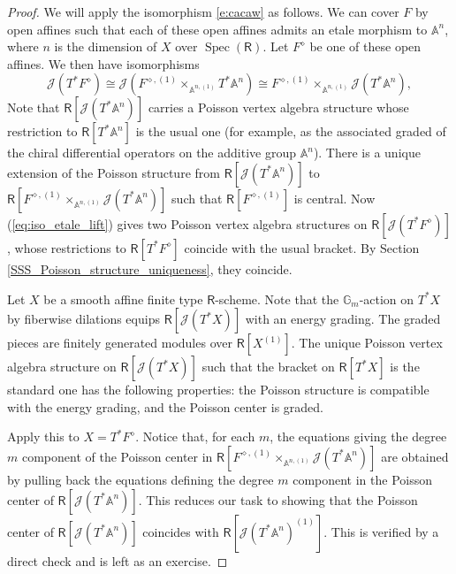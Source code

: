\documentclass{amsart}
\theoremstyle{definition}
\newcommand{\Ring}{\mathsf{R}}
\newcommand{\Jet}{\mathscr{J}}
\numberwithin{equation}{section}
\begin{document}
\begin{proof}
We will apply the  isomorphism \eqref{e:cacaw} as follows. We can cover $F$ by open affines such that each of these open affines admits an etale morphism to $\mathbb{A}^n$, where $n$ is the dimension of $X$ over $\operatorname{Spec}(\Ring)$. Let $F^\diamond$ be one of these open affines.  We then have isomorphisms
\begin{equation}\label{eq:iso_etale_lift}
\Jet(T^*F^\diamond)\cong \Jet(F^{\diamond,(1)}\times_{\mathbb{A}^{n,(1)}} T^* \mathbb{A}^n ) \cong F^{\diamond,(1)}\times_{\mathbb{A}^{n,(1)}}\Jet(T^*\mathbb{A}^n),
\end{equation}
Note that $\Ring[\Jet(T^*\mathbb{A}^n)]$ carries a Poisson vertex algebra structure whose restriction to $\Ring[T^*\mathbb{A}^n]$ is the usual one (for example, as the associated graded of the chiral differential operators on the additive group $\mathbb{A}^n$). 
There is a unique extension of the Poisson structure from 
$\Ring[\Jet(T^*\mathbb{A}^n)]$ to $\Ring[F^{\diamond,(1)}\times_{\mathbb{A}^{n,(1)}}\Jet(T^*\mathbb{A}^n)]$ such that $\Ring[F^{\diamond,(1)}]$ is central.
Now (\ref{eq:iso_etale_lift}) gives two Poisson vertex algebra structures on $\Ring[\Jet(T^*F^\diamond)]$, whose restrictions to $\Ring[T^*F^\diamond]$ coincide with the usual bracket. By Section \ref{SSS_Poisson_structure_uniqueness}, they coincide. 

Let $X$ be a smooth affine finite type $\Ring$-scheme.  
Note that the $\mathbb{G}_m$-action on $T^*X$ by fiberwise dilations equips $\Ring[\Jet(T^*X)]$ with an energy grading. The graded pieces are finitely generated modules over $\Ring[X^{(1)}]$. 
The unique  Poisson vertex algebra structure on $\Ring[\Jet(T^*X)]$ such that the bracket on $\Ring[T^*X]$ is the standard one has the following properties: the Poisson structure is compatible with the energy grading, and the Poisson center is graded. 

Apply this to $X=T^*F^\diamond$.
Notice that, for each $m$, the equations giving the degree $m$ component of the Poisson center in $\Ring[F^{\diamond,(1)}\times_{\mathbb{A}^{n,(1)}}\Jet(T^*\mathbb{A}^n)]$ are obtained by pulling back the equations defining the degree $m$ component in the Poisson center of $\Ring[\Jet(T^*\mathbb{A}^n)]$. This reduces our task to showing that the Poisson center of  $\Ring[\Jet(T^*\mathbb{A}^n)]$ coincides with
$\Ring[\Jet(T^*\mathbb{A}^n)^{(1)}]$. This is verified by a direct check and is left as an exercise.
\end{proof}
\end{document}
